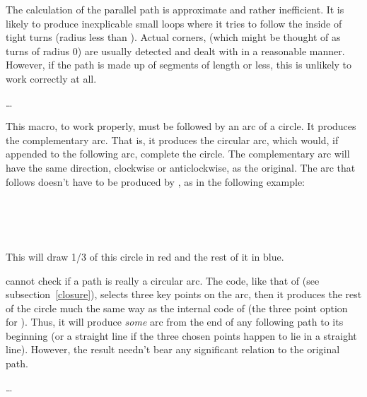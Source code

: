 \documentclass[letterpaper]{article}
\begin{document}
The calculation of the parallel path is approximate and rather
inefficient. It is likely to produce inexplicable small loops where it
tries to follow the inside of tight turns (radius less than
). Actual corners, (which might be thought of as turns of
radius $0$) are usually detected and dealt with in a reasonable manner.
However, if the path is made up of segments of length  or
less, this is unlikely to work correctly at all.

\begin{cd}
\dots%
\end{cd}

This macro, to work properly, must be followed by an arc of a circle. It
produces the complementary arc. That is, it produces the circular arc,
which would, if appended to the following arc, complete the circle. The
complementary arc will have the same direction, clockwise or
anticlockwise, as the original. The arc that follows doesn't have to be
produced by , as in the following example:
\begin{ex}
  \\
\ \\
\ 
\end{ex}
This will draw 1/3 of this circle in red and the rest of it in blue.

\CMF{} cannot check if a path is really a circular arc. The \MF{} code,
like that of  (see subsection~\ref{closure}), selects
three key points on the arc, then it produces the rest of the circle
much the same way as the internal code of  (the three
point option for ). Thus, it will produce \emph{some} arc from
the end of any following path to its beginning (or a straight line if
the three chosen points happen to lie in a straight line). However, the
result needn't bear any significant relation to the original path.

\begin{cd}
\dots
{}
\end{cd}
\end{document}
